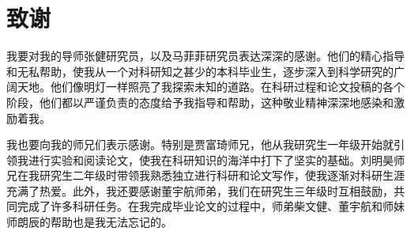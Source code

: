 \chapter[致谢]{致\quad 谢}%





我要对我的导师张健研究员，以及马菲菲研究员表达深深的感谢。他们的精心指导和无私帮助，使我从一个对科研知之甚少的本科毕业生，逐步深入到科学研究的广阔天地。他们像明灯一样照亮了我探索未知的道路。在科研过程和论文投稿的各个阶段，他们都以严谨负责的态度给予我指导和帮助，这种敬业精神深深地感染和激励着我。

我也要向我的师兄们表示感谢。特别是贾富琦师兄，他从我研究生一年级开始就引领我进行实验和阅读论文，使我在科研知识的海洋中打下了坚实的基础。刘明昊师兄在我研究生二年级时带领我熟悉独立进行科研和论文写作，使我逐渐对科研生涯充满了热爱。此外，我还要感谢董宇航师弟，我们在研究生三年级时互相鼓励，共同完成了许多科研任务。在我完成毕业论文的过程中，师弟柴文健、董宇航和师妹师朗辰的帮助也是我无法忘记的。

